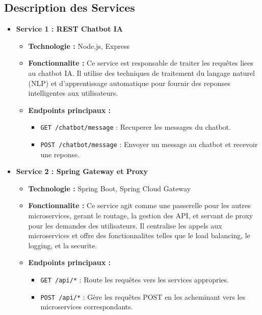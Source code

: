 \documentclass[a4paper, 11pt, openany]{report}
\begin{document}
\subsection{Description des Services}
\begin{itemize}
    \item \textbf{Service 1 : REST Chatbot IA}
    \begin{itemize}
        \item \textbf{Technologie :} Node.js, Express
        \item \textbf{Fonctionnalite :} Ce service est responsable de traiter les requêtes liees au chatbot IA. Il utilise des techniques de traitement du langage naturel (NLP) et d'apprentissage automatique pour fournir des reponses intelligentes aux utilisateurs.
        \item \textbf{Endpoints principaux :}
        \begin{itemize}
            \item \texttt{GET /chatbot/message} : Recuperer les messages du chatbot.
            \item \texttt{POST /chatbot/message} : Envoyer un message au chatbot et recevoir une reponse.
        \end{itemize}
    \end{itemize}
    
    \item \textbf{Service 2 : Spring Gateway et Proxy}
    \begin{itemize}
        \item \textbf{Technologie :} Spring Boot, Spring Cloud Gateway
        \item \textbf{Fonctionnalite :} Ce service agit comme une passerelle pour les autres microservices, gerant le routage, la gestion des API, et servant de proxy pour les demandes des utilisateurs. Il centralise les appels aux microservices et offre des fonctionnalites telles que le load balancing, le logging, et la securite.
        \item \textbf{Endpoints principaux :}
        \begin{itemize}
            \item \texttt{GET /api/*} : Route les requêtes vers les services appropries.
            \item \texttt{POST /api/*} : Gère les requêtes POST en les acheminant vers les microservices correspondants.
        \end{itemize}
    \end{itemize}
    

\end{itemize}
\end{document}

